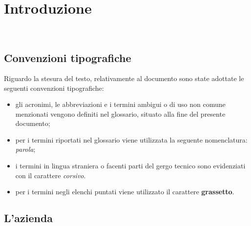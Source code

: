 \chapter{Introduzione}
\label{cap:introduzione}

\\





\section{Convenzioni tipografiche}
\label{sec:convenzioni-tipografiche}

Riguardo la stesura del testo, relativamente al documento sono state adottate le seguenti convenzioni tipografiche:
\begin{itemize}
	\item gli acronimi, le abbreviazioni e i termini ambigui o di uso non comune menzionati vengono definiti nel glossario, situato alla fine del presente documento;
	\item per i termini riportati nel glossario viene utilizzata la seguente nomenclatura: \emph{parola}\glsoccur;
	\item i termini in lingua straniera o facenti parti del gergo tecnico sono evidenziati con il carattere \emph{corsivo}.
	\item per i termini negli elenchi puntati viene utilizzato il carattere \textbf{grassetto}.
\end{itemize}

\section{L'azienda}
\label{sec:azienda}

